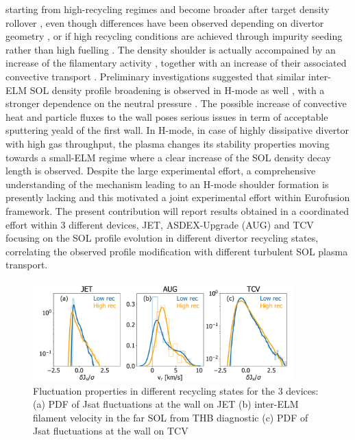 \documentclass[12pt, a4paper, twoside]{article}
\begin{document}
starting from high-recycling regimes and become broader after target
density rollover \cite{vianello:nf2019}, even
though differences have been observed depending on divertor geometry
\cite{Wynn:2018gp}, or if high recycling conditions are achieved
through impurity seeding rather than high fuelling
\cite{Wynn:2018gp,Kuang:2019248}.
The density shoulder is actually accompained by
an increase of the filamentary activity
\cite{Carralero:2017gb,vianello:nf2019,Kuang:2019248}, together with an increase of
their associated convective transport \cite{Carralero:2017gb}.
Preliminary investigations suggested that similar inter-ELM SOL
density profile broadening is observed in H-mode as well
\cite{Muller:2015jt,Carralero:2017gb,vianello:nf2019}, with a stronger
dependence on the neutral pressure \cite{vianello:nf2019}. The
possible increase of convective heat and particle fluxes to the wall
poses serious issues in term of acceptable sputtering yeald of the
first wall. In H-mode,
in case of highly dissipative divertor with high gas throughput, the
plasma changes its stability properties moving towards a small-ELM
regime \cite{labit:nf2019} where a clear increase of
the SOL density decay length is observed.
Despite the
large experimental effort, a comprehensive understanding
of the mechanism leading to an H-mode shoulder formation is presently
lacking and this motivated a joint experimental effort within
Eurofusion framework.
The present contribution will report results obtained in a
coordinated effort within 3 different devices, JET, ASDEX-Upgrade (AUG) and
TCV focusing on the SOL profile evolution in different divertor recycling
states, correlating the observed profile modification with different turbulent SOL
plasma transport.
\begin{figure}
\includegraphics[width=100mm]{../pdfbox/SynopsisFluctuationCombined.pdf}
\caption{Fluctuation properties in different recycling states for the
  3 devices:(a) PDF of Jsat fluctuations at the wall on JET (b)
  inter-ELM filament velocity in the far SOL from THB diagnostic (c) PDF of Jsat fluctuations at the wall on TCV}
\vspace{-2.6ex}
\label{fig:figFluctuations}
\end{figure}
\end{document}
